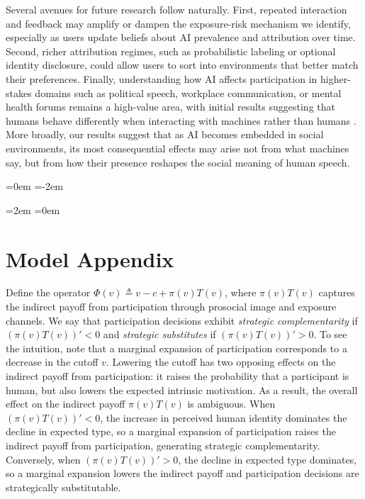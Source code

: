 \documentclass[12pt,notitlepage]{article}
\theoremstyle{plain}
\theoremstyle{plain}
\theoremstyle{definition}
\theoremstyle{definition}
\theoremstyle{assumption}
\theoremstyle{plain}
\theoremstyle{plain}
\theoremstyle{plain}
\theoremstyle{plain}
\theoremstyle{definition}%
\theoremstyle{plain}
\theoremstyle{plain}
\theoremstyle{plain}
\theoremstyle{plain}
\begin{document}
Several avenues for future research follow naturally. First, repeated interaction and feedback may amplify or dampen the exposure-risk mechanism we identify, especially as users update beliefs about AI prevalence and attribution over time. Second, richer attribution regimes, such as probabilistic labeling or optional identity disclosure, could allow users to sort into environments that better match their preferences. Finally, understanding how AI affects participation in higher-stakes domains such as political speech, workplace communication, or mental health forums remains a high-value area, with initial results suggesting that humans behave differently when interacting with machines rather than humans \citep{marechal2020,chugunova2022we,bogliacino2023}. More broadly, our results suggest that as AI becomes embedded in social environments, its most consequential effects may arise not from what machines say, but from how their presence reshapes the social meaning of human speech.


\newpage\leftskip=0em 
\parindent=-2em
\onehalfspacing




\parindent=2em
\leftskip=0em

\clearpage{}

\pagebreak{}

\appendix

\setcounter{figure}{0} \renewcommand{\thefigure}{A\arabic{figure}}

\setcounter{table}{0} \renewcommand{\thetable}{A\arabic{table}}\pagestyle{fancy}


\section{Model Appendix}\label{appendix:theoretical framework}

Define the operator $\Phi(v)\triangleq v - c + \pi(v)T(v)$, where $\pi(v)T(v)$ captures the indirect payoff from participation through prosocial image and exposure channels. We say that participation decisions exhibit \textit{strategic complementarity} if $(\pi(v)T(v))'<0$ and \textit{strategic substitutes} if $(\pi(v)T(v))'>0$. To see the intuition, note that a marginal expansion of participation corresponds to a decrease in the cutoff $v$. Lowering the cutoff has two opposing effects on the indirect payoff from participation: it raises the probability that a participant is human, but also lowers the expected intrinsic motivation. As a result, the overall effect on the indirect payoff $\pi(v)T(v)$ is ambiguous. When $(\pi(v)T(v))'<0$, the increase in perceived human identity dominates the decline in expected type, so a marginal expansion of participation raises the indirect payoff from participation, generating strategic complementarity. Conversely, when $(\pi(v)T(v))'>0$, the decline in expected type dominates, so a marginal expansion lowers the indirect payoff and participation decisions are strategically substitutable.
\end{document}
